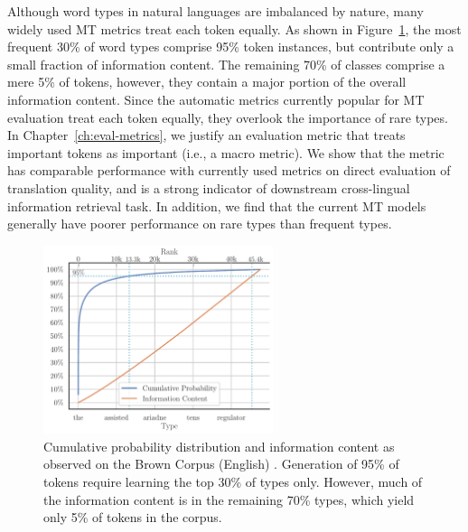Although word types in natural languages are imbalanced by nature, many widely used MT metrics treat each token equally. 
As shown in Figure~\ref{fig:brown-shannons-cum}, the most frequent 30\% of word types comprise 95\% token instances, but contribute only a small fraction of information content. 
 The remaining 70\% of classes comprise a mere 5\% of tokens, however, they contain a major portion of the overall information content.
Since the automatic metrics currently popular for MT evaluation treat each token equally, they overlook the importance of rare types.
In Chapter~\ref{ch:eval-metrics}, we justify an evaluation metric that treats important tokens as important (i.e., a macro metric). 
We show that the metric has comparable performance with currently used metrics on direct evaluation of translation quality, and is a strong indicator of downstream cross-lingual information retrieval task.
In addition, we find that the current MT models generally have poorer performance on rare types than frequent types.

\begin{figure}[ht]
    \centering
    \includegraphics[width=0.6\textwidth] {img/background/brown-corpus-shannons-cum.pdf}
    \caption{Cumulative probability distribution and information content as observed on the Brown Corpus (English) \cite{kuvcera1967brown-corpus}.
    Generation of 95\% of tokens require learning the top 30\% of types only. 
    However, much of the information  content is in the remaining 70\% types, which yield only 5\% of tokens in the corpus.}
    \label{fig:brown-shannons-cum}
\end{figure}


